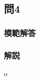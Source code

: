 \documentclass[a4j,titlepage,dvipdfmx]{jsarticle}   %
\newcommand{\codepath}{./code/02_Answer}
\begin{document}
\subsection{問4}
\subsubsection{模範解答}

\subsubsection{解説}
o
\end{document}
